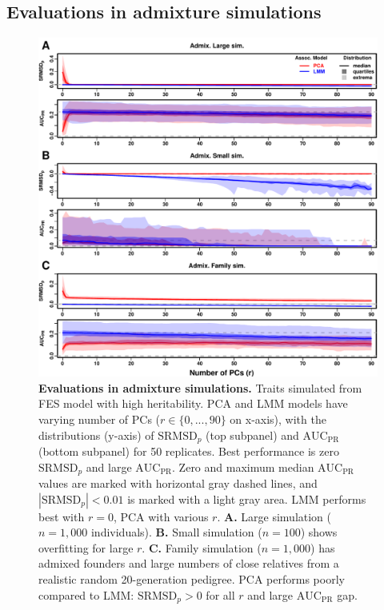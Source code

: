 \documentclass[11pt]{article}
\newcommand{\rmsd}{\text{SRMSD}_p}
\newcommand{\auc}{\text{AUC}_\text{PR}}
\begin{document}
\begin{linenumbers}
\subsection{Evaluations in admixture simulations}

\begin{figure}[hp]
  \centering
  \includegraphics[width=\textwidth,height=\textheight,keepaspectratio]{fes/rmsd-auc-sim.pdf}
  \caption{
    {\bf Evaluations in admixture simulations.}
    Traits simulated from FES model with high heritability.
    PCA and LMM models have varying number of PCs ($r \in \{0, ..., 90\}$ on x-axis), with the distributions (y-axis) of $\rmsd$ (top subpanel) and $\auc$ (bottom subpanel) for 50 replicates.
    Best performance is zero $\rmsd$ and large $\auc$.
    Zero and maximum median $\auc$ values are marked with horizontal gray dashed lines, and $|\rmsd| < 0.01$ is marked with a light gray area.
    LMM performs best with $r=0$, PCA with various $r$.
    \textbf{A.}
    Large simulation ($n = 1,000$ individuals).
    \textbf{B.}
    Small simulation ($n = 100$) shows overfitting for large $r$.
    \textbf{C.}
    Family simulation ($n = 1,000$) has admixed founders and large numbers of close relatives from a realistic random 20-generation pedigree.
    PCA performs poorly compared to LMM: $\rmsd > 0$ for all $r$ and large $\auc$ gap.
  }
  \label{fig:rmsd-auc-sim}
\end{figure}


\end{linenumbers}
\end{document}
